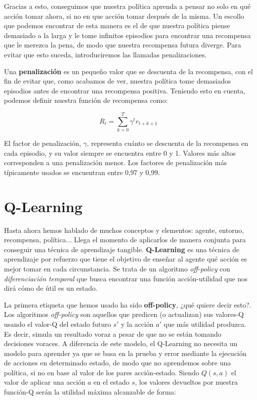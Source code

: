 Gracias a esto, conseguimos que nuestra política aprenda a pensar no solo en qué acción tomar ahora, si no en que acción tomar después de la misma. Un escollo que podemos encontrar de esta manera es el de que nuestra política piense demasiado a la larga y le tome infinitos episodios para encontrar una recompensa que le merezca la pena, de modo que nuestra recompensa futura diverge. Para evitar que esto suceda, introduciremos las llamadas penalizaciones.

Una \textbf{penalización} es un pequeño valor que se descuenta de la recompensa, con el fin de evitar que, como acabamos de ver, nuestra política tome demasiados episodios antes de encontrar una recompensa positiva. Teniendo esto en cuenta, podemos definir nuestra función de recompensa como:

\begin{equation}
    R_{t} = \sum^{T}_{k = 0} \gamma^{t}r_{t + k + 1}
\end{equation}

El factor de penalización, \( \gamma \), representa cuánto se descuenta de la recompensa en cada episodio, y su valor siempre se encuentra entre 0 y 1. Valores más altos corresponden a una penalización menor. Los factores de penalización más típicamente usados se encuentran entre 0,97 y 0,99.


\section{Q-Learning}
Hasta ahora hemos hablado de muchos conceptos y elementos: agente, entorno, recompensa, política... Llega el momento de aplicarlos de manera conjunta para conseguir una técnica de aprendizaje tangible. \textbf{Q-Learning} es una técnica de aprendizaje por refuerzo que tiene el objetivo de enseñar al agente qué acción es mejor tomar en cada circunstancia. Se trata de un algoritmo \textit{off-policy} con \textit{diferenciación temporal} que busca encontrar una función acción-utilidad que nos dirá cómo de útil es un estado. 

La primera etiqueta que hemos usado ha sido \textbf{off-policy}, ¿qué quiere decir esto?. Los algoritmos \textit{off-policy} son aquellos que predicen (o actualizan) sus valores-Q usando el valor-Q del estado futuro $s'$ y la acción $a'$ que más utilidad produzca. Es decir, simula un resultado voraz a pesar de que no se están tomando decisiones voraces. A diferencia de este modelo, el Q-Learning no necesita un modelo para aprender ya que se basa en la prueba y error mediante la ejecución de acciones en determinado estado, de modo que no aprendemos sobre una política, si no en base al valor de los pares acción-estado. Siendo $Q(s, a)$ el valor de aplicar una acción $a$ en el estado $s$, los valores devueltos por nuestra función-Q serán la utilidad máxima alcanzable de forma:

